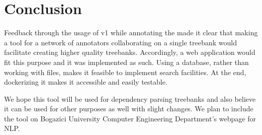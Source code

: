 \section{Conclusion}
\label{sec:conclusion}
Feedback through the usage of \boat{} v1 while annotating the \bountreebank{} made it clear that making a tool for a network of annotators collaborating on a single treebank would facilitate creating higher quality treebanks.
Accordingly, a web application would fit this purpose and it was implemented as such.
Using a database, rather than working with \conllu{} files, makes it feasible to implement search facilities.
At the end, dockerizing it makes it accessible and easily testable.

We hope this tool will be used for dependency parsing treebanks and also believe it can be used for other purposes as well with slight changes.
We plan to include the tool on Bogazici University Computer Engineering Department's webpage for NLP.
